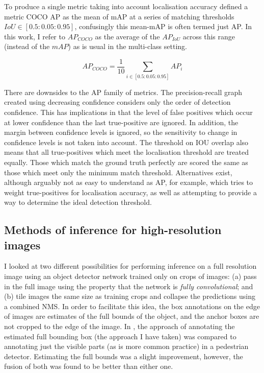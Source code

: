 To produce a single metric taking into account localisation accuracy \cite{Lin2014} defined a metric COCO \gls{AP} as the mean of \gls{mAP} at a series of matching thresholds $ IoU \in [0.5 : 0.05 : 0.95] $, confusingly this mean-\gls{mAP} is often termed just \gls{AP}. In this work, I refer to $AP_{COCO}$ as the average of the $AP_{IoU}$ across this range (instead of the $mAP$) as is usual in the multi-class setting.

\begin{equation}
AP_{COCO} = \frac{1}{10}\sum_{i \in [0.5 : 0.05 : 0.95]}AP_{i}
\label{eq:ap_coco}
\end{equation}

There are downsides to the \gls{AP} family of metrics. The precision-recall graph created using decreasing confidence considers only the order of detection confidence. This has implications in that the level of false positives which occur at lower confidence than the last true-positive are ignored. In addition, the margin between confidence levels is ignored, so the sensitivity to change in confidence levels is not taken into account. The threshold on \gls{IOU} overlap also means that all true-positives which meet the localisation threshold are treated equally. Those which match the ground truth perfectly are scored the same as those which meet only the minimum match threshold. Alternatives exist, although arguably not as easy to understand as \gls{AP}, for example, \cite{Oksuz2018} which tries to weight true-positives for localisation accuracy, as well as attempting to provide a way to determine the ideal detection threshold.


\subsection{Methods of inference for high-resolution images}
\label{sec:highres_inference}

I looked at two different possibilities for performing inference on a full resolution image using an object detector network trained only on crops of images: (a) pass in the full image using the property that the network is \emph{fully convolutional}; and (b) tile images the same size as training crops and collapse the predictions using a combined \gls{NMS}. In order to facilitate this idea, the box annotations on the edge of images are estimates of the full bounds of the object, and the anchor boxes are not cropped to the edge of the image. In \cite{Duarte2010}, the approach of annotating the estimated full bounding box (the approach I have taken) was compared to annotating just the visible parts (as is more common practice) in a pedestrian detector. Estimating the full bounds was a slight improvement, however, the fusion of both was found to be better than either one. 

